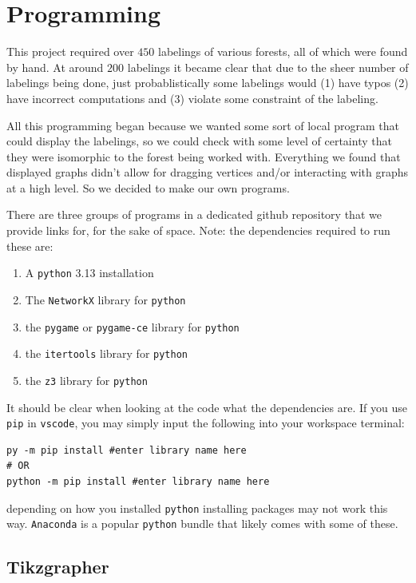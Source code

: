 \chapter{Programming}\label{chap:programming}
This project required over $450$ labelings of various forests, all of which were found by hand. At around $200$ labelings it became clear that due to the sheer number of labelings being done, just probablistically some labelings would (1) have typos (2) have incorrect computations and (3) violate some constraint of the labeling.

All this programming began because we wanted some sort of local program that could display the labelings, so we could check with some level of certainty that they were isomorphic to the forest being worked with. Everything we found that displayed graphs didn't allow for dragging vertices and/or interacting with graphs at a high level. So we decided to make our own programs.

There are three groups of programs in a dedicated github repository that we provide links for, for the sake of space. Note: the dependencies required to run these are:

\begin{enumerate}
  \item A \verb|python| 3.13 installation
  \item The \verb|NetworkX| library for \verb|python|
  \item the \verb|pygame| or \verb|pygame-ce| library for \verb|python|
  \item the \verb|itertools| library for \verb|python|
  \item the \verb|z3| library for \verb|python|
\end{enumerate}
It should be clear when looking at the code what the dependencies are. If you use \verb|pip| in \verb|vscode|, you may simply input the following into your workspace terminal: 
\begin{verbatim}
py -m pip install #enter library name here
# OR
python -m pip install #enter library name here
\end{verbatim}
depending on how you installed \verb|python| installing packages may not work this way. \verb|Anaconda| is a popular \verb|python| bundle that likely comes with some of these.

\section{Tikzgrapher}

